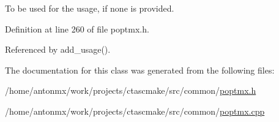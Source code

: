 To be used for the usage, if none is provided. 



Definition at line 260 of file poptmx.h.



Referenced by add\_\-usage().



The documentation for this class was generated from the following files:\begin{DoxyCompactItemize}
\item 
/home/antonmx/work/projects/ctascmake/src/common/\hyperlink{poptmx_8h}{poptmx.h}\item 
/home/antonmx/work/projects/ctascmake/src/common/\hyperlink{poptmx_8cpp}{poptmx.cpp}\end{DoxyCompactItemize}
